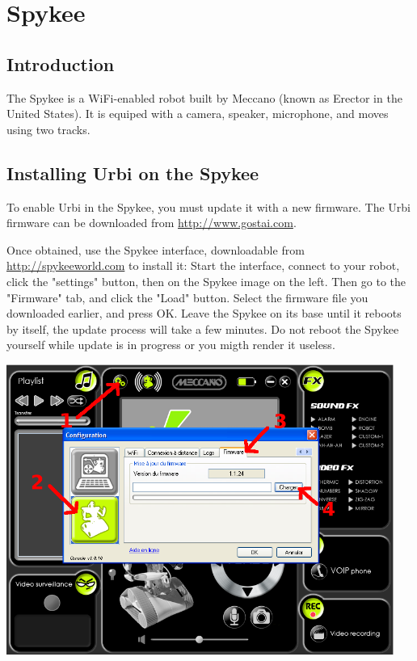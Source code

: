 \chapter{Spykee}

\section{Introduction}

The Spykee is a WiFi-enabled robot built by Meccano (known as Erector in the
United States). It is equiped with a camera, speaker, microphone, and moves
using two tracks.

\section{Installing Urbi on the Spykee}

To enable Urbi in the Spykee, you must update it with a new firmware. The Urbi
firmware can be downloaded from \url{http://www.gostai.com}.

Once obtained, use the Spykee interface, downloadable from
\url{http://spykeeworld.com} to install it: Start the interface, connect to
your robot, click the "settings" button, then on the Spykee image on the left.
Then go to the "Firmware" tab, and click the "Load" button. Select the firmware
file you downloaded earlier, and press OK. Leave the Spykee on its base until it
reboots by itself, the update process will take a few minutes. Do not reboot
the Spykee yourself while update is in progress or you migth render it useless.
\begin{center}
\includegraphics[width=0.95\textwidth]{img/spykee-flash-instructions}
\end{center}

